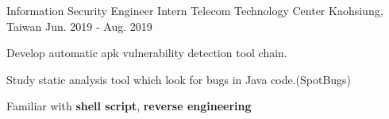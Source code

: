 \begin{cventries}
  \cventry
  {Information Security Engineer Intern} %
  {Telecom Technology Center} %
  {Kaohsiung, Taiwan} %
  {Jun. 2019 - Aug. 2019} %
  {
    \begin{cvitems} %
      \item {Develop automatic apk vulnerability detection tool chain.}
      \item {Study static analysis tool which look for bugs in Java code.(SpotBugs)}
      \item {Familiar with \textbf{shell script}, \textbf{reverse engineering}}
    \end{cvitems}
  }

\end{cventries}
